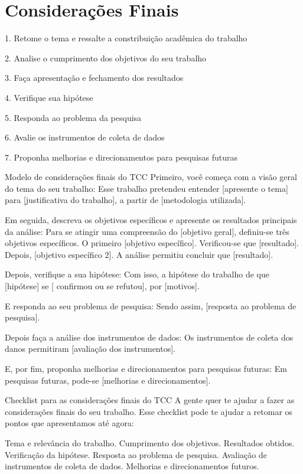 \chapter{Considerações Finais}
\label{chap:Resultados Finais} 

1. Retome o tema e ressalte a constribuição acadêmica do trabalho

2. Analise o cumprimento dos objetivos do seu trabalho

3. Faça apresentação e fechamento dos resultados

4. Verifique sua hipótese

5. Responda ao problema da pesquisa

6. Avalie os instrumentos de coleta de dados

7. Proponha melhorias e direcionamentos para pesquisas futuras

Modelo de considerações finais do TCC
Primeiro, você começa com a visão geral do tema do seu trabalho:
Esse trabalho pretendeu entender [apresente o tema] para [justificativa do trabalho], a partir de [metodologia utilizada].

Em seguida, descreva os objetivos específicos e apresente os resultados principais da análise:
Para se atingir uma compreensão do [objetivo geral], definiu-se três objetivos específicos. O primeiro [objetivo específico]. Verificou-se que [resultado]. Depois, [objetivo específico 2]. A análise permitiu concluir que [resultado].

Depois, verifique a sua hipótese:
Com isso, a hipótese do trabalho de que [hipótese] se [ confirmou ou se refutou], por [motivos].

E responda ao seu problema de pesquisa:
Sendo assim, [resposta ao problema de pesquisa].

Depois faça a análise dos instrumentos de dados:
Os instrumentos de coleta dos danos permitiram [avaliação dos instrumentos].

E, por fim, proponha melhorias e direcionamentos para pesquisas futuras:
Em pesquisas futuras, pode-se [melhorias e direcionamentos].

Checklist para as considerações finais do TCC
A gente quer te ajudar a fazer as considerações finais do seu trabalho. Esse checklist pode te ajudar a retomar os pontos que apresentamos até agora:

Tema e relevância do trabalho.
Cumprimento dos objetivos.
Resultados obtidos.
Verificação da hipótese.
Resposta ao problema de pesquisa.
Avaliação de instrumentos de coleta de dados. 
Melhorias e direcionamentos futuros. 